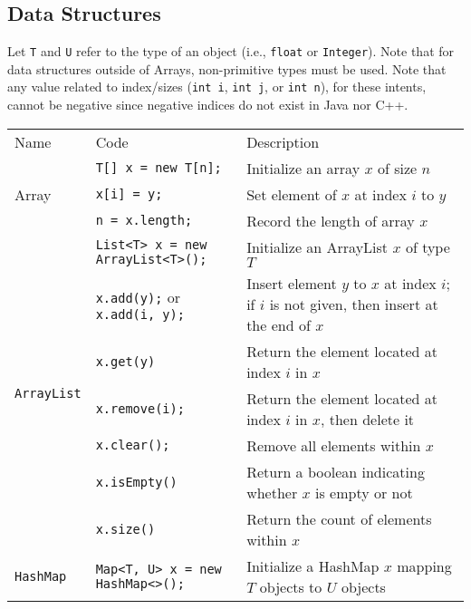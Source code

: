 \documentclass{article}
\begin{document}
\subsection{Data Structures}
Let \lstinline|T| and \lstinline|U| refer to the type of an object (i.e., \lstinline|float| or \lstinline|Integer|). Note that for data structures outside of Arrays, non-primitive types must be used.
Note that any value related to index/sizes (\lstinline|int i|, \lstinline|int j|, or \lstinline|int n|), for these intents, cannot be negative since negative indices do not exist in Java nor C++.
\setlength{\tabcolsep}{3pt}
\begin{center}\begin{tabularx}{\textwidth}{llX}\toprule
  Name & Code & Description\\
  \multirow{3}{*}{Array} & \lstinline|T[] x = new T[n];| & Initialize an array \(x\) of size \(n\)\\
                         & \lstinline|x[i] = y;| & Set element of \(x\) at index \(i\) to \(y\)\\
                         & \lstinline|n = x.length;| & Record the length of array \(x\) \\\midrule
  \multirow{7}{*}[-0.5em]{\lstinline|ArrayList|} & \lstinline|List<T> x = new ArrayList<T>();| & Initialize an ArrayList \(x\) of type \(T\)\\
                                         & \lstinline|x.add(y);| or \lstinline|x.add(i, y);| & Insert element \(y\) to \(x\) at index \(i\); if \(i\) is not given, then insert at the end of \(x\)\\
                                         & \lstinline|x.get(y)| & Return the element located at index \(i\) in \(x\) \\
                                         & \lstinline|x.remove(i);| & Return the element located at index \(i\) in \(x\), then delete it\\
                                         & \lstinline|x.clear();| & Remove all elements within \(x\)\\
                                         & \lstinline|x.isEmpty()| & Return a boolean indicating whether \(x\) is empty or not\\
                                         & \lstinline|x.size()| & Return the count of elements within \(x\)\\\midrule
  \multirow{8}{*}[-2em]{\lstinline|HashMap|} & \lstinline|Map<T, U> x = new HashMap<>();| & Initialize a HashMap \(x\) mapping \(T\) objects to \(U\) objects\\

\end{tabularx}
\end{center}
\end{document}
